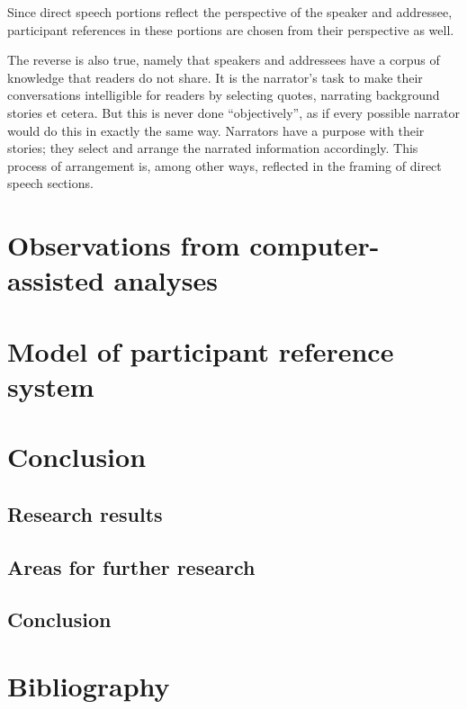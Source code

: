 \documentclass[twoside,a4paper,10pt]{article}
\begin{document}
Since direct speech portions reflect the perspective of the speaker and addressee, participant references in these portions are chosen from their perspective as well.

The reverse is also true, namely that speakers and addressees have a corpus of knowledge that readers do not share. It is the narrator's task to make their conversations intelligible for readers by selecting quotes, narrating background stories et cetera. But this is never done ``objectively'', as if every possible narrator would do this in exactly the same way. Narrators have a purpose with their stories; they select and arrange the narrated information accordingly. This process of arrangement is, among other ways, reflected in the framing of direct speech sections.


\section{Observations from computer-assisted analyses}
\section{Model of participant reference system}
\newpage
\section{Conclusion}
\subsection{Research results}
\subsection{Areas for further research}
\subsection{Conclusion}
\newpage
\section*{Bibliography}
\printbibliography
\end{document}
